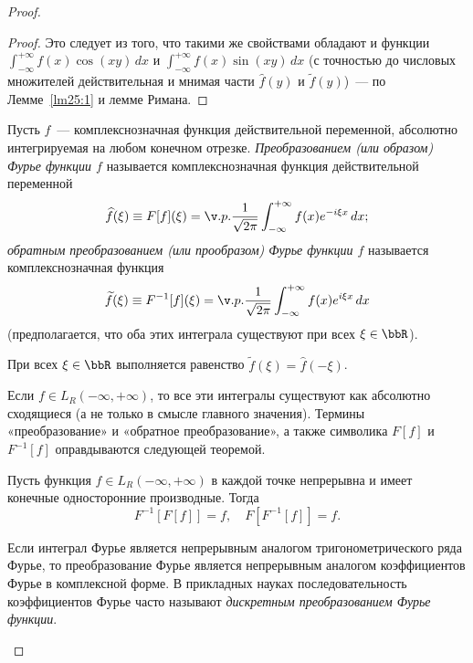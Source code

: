 \begin{proof}
\begin{proof}
Это следует из того, что такими же свойствами обладают и функции $\int_{-\infty}^{+\infty} f(x)\cos(xy)\,dx$ и $\int_{-\infty}^{+\infty} f(x)\sin(xy)\,dx$ (с точностью до числовых множителей действительная и мнимая части $\widehat{f}(y)$ и $\widetilde{f}(y)$)~--- по Лемме~\ref{lm25:1} и лемме Римана.
\end{proof}


\begin{defn}
\label{df25:4}
Пусть $f$~--- комплекснозначная функция действительной переменной, абсолютно интегрируемая на любом конечном отрезке. \textit{Преобразованием (или образом) Фурье функции $f$} называется комплекснозначная функция действительной переменной
$$
\widehat{f}(\xi) \equiv F[f](\xi) = \v.p.\frac{1}{\sqrt{2\pi}}\int_{-\infty}^{+\infty} f(x)e^{-i\xi x}\,dx;
$$
\textit{обратным преобразованием (или прообразом) Фурье функции $f$} называется комплекснозначная функция
$$
\widetilde{f}(\xi) \equiv F^{-1}[f](\xi) = \v.p.\frac{1}{\sqrt{2\pi}}\int_{-\infty}^{+\infty} f(x)e^{i\xi x}\,dx
$$
(предполагается, что оба этих интеграла существуют при всех $\xi \in \bbR$).
\end{defn}

\begin{notion}
При всех $\xi \in \bbR$ выполняется равенство $\widetilde{f}(\xi) = \widehat{f}(-\xi)$.

Если $f \in L_R(-\infty, +\infty)$, то все эти интегралы существуют как абсолютно сходящиеся (а не только в смысле главного значения). Термины «преобразование» и «обратное преобразование», а также символика $F[f]$ и $F^{-1}[f]$ оправдываются следующей теоремой.
\end{notion}

\begin{thm}
\label{th25:3}
Пусть функция $f \in L_R(-\infty, +\infty)$ в каждой точке непрерывна и имеет конечные односторонние производные. Тогда
$$
F^{-1}[F[f]] = f, \quad F[F^{-1}[f]] = f.
$$
\end{thm}


\begin{notion}
Если интеграл Фурье является непрерывным аналогом тригонометрического ряда Фурье, то преобразование Фурье является непрерывным аналогом коэффициентов Фурье в комплексной форме. В прикладных науках последовательность коэффициентов Фурье часто называют \textit{дискретным преобразованием Фурье функции}.
\end{notion}


\end{proof}
